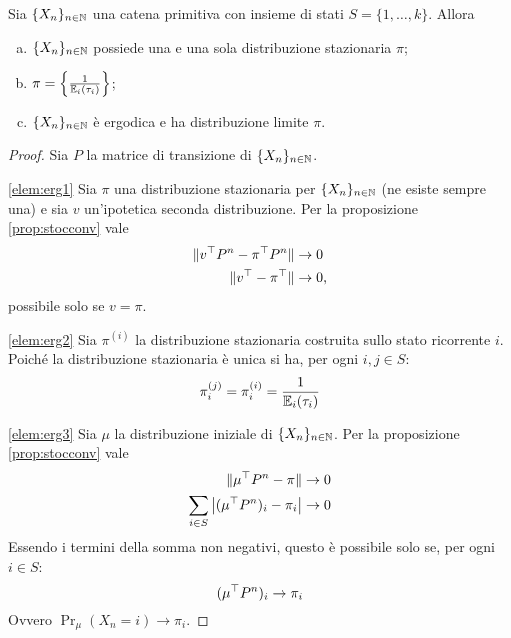 \begin{thm}
	Sia $\{X_n\}_{n\in\mathbb N}$ una catena primitiva con insieme di stati $S=\{1,\dots,k\}$. Allora
	\begin{enumerate}[(a)]
		\item \label{elem:erg1} $\{X_n\}_{n\in\mathbb N}$ possiede una e una sola distribuzione stazionaria $\pi$;
		\item \label{elem:erg2} $\pi=\left\{ \frac{1}{\mathbb E_i(\tau_i)} \right\}$;
		\item \label{elem:erg3} $\{X_n\}_{n\in\mathbb N}$ è ergodica e ha distribuzione limite $\pi$.
	\end{enumerate}
\end{thm}
\begin{proof}
	Sia $P$ la matrice di transizione di $\{X_n\}_{n\in\mathbb N}$.

	\ref{elem:erg1} Sia $\pi$ una distribuzione stazionaria per $\{X_n\}_{n\in\mathbb N}$ (ne esiste sempre una) e sia $v$ un'ipotetica seconda distribuzione. Per la proposizione \ref{prop:stocconv} vale
	\begin{align*}
		\|v^\top P^n-\pi^\top P^n\| & \to 0        \\
		\|v^\top-\pi^\top\|         & \to 0 \text,
	\end{align*}
	possibile solo se $v=\pi$.

	\ref{elem:erg2} Sia $\pi^{(i)}$ la distribuzione stazionaria costruita sullo stato ricorrente $i$. Poiché la distribuzione stazionaria è unica si ha, per ogni $i,j\in S$:
	\begin{equation*}
		\pi^{(j)}_i = \pi^{(i)}_i = \frac{1}{\mathbb E_i(\tau_i)}
	\end{equation*}

	\ref{elem:erg3} Sia $\mu$ la distribuzione iniziale di $\{X_n\}_{n\in\mathbb N}$. Per la proposizione \ref{prop:stocconv} vale
	\begin{align*}
		\|\mu^\top P^n-\pi\|                   & \to 0 \\
		\sum_{i\in S}\left|(\mu^\top P^n)_i-\pi_i\right| & \to 0
	\end{align*}
	Essendo i termini della somma non negativi, questo è possibile solo se, per ogni $i\in S$:
	\begin{equation*}
		(\mu^\top P^n)_i \to \pi_i
	\end{equation*}
	Ovvero $\Pr_{\mu}(X_n=i)\to \pi_i$. \qedhere
\end{proof}
